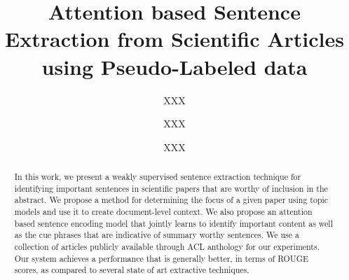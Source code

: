 \documentclass[sigconf]{acmart}
\begin{document}
\title{Attention based Sentence Extraction from Scientific Articles using Pseudo-Labeled data}


\author{XXX}


\author{XXX}

\author{XXX}


\begin{abstract}
In this work, we present a weakly supervised sentence extraction technique for identifying important sentences in scientific papers that are worthy of inclusion in the abstract. We propose a method for determining the focus of a given paper using topic models and use it to create document-level context. We also propose an attention based sentence encoding model that jointly learns to identify important content as well as the cue phrases that are indicative of summary worthy sentences. We use a collection of articles publicly available through ACL anthology for our experiments. Our system achieves a performance that is generally better, in terms of ROUGE scores, as compared to several state of art extractive techniques. 
\end{abstract}

%
%



\maketitle





\end{document}
